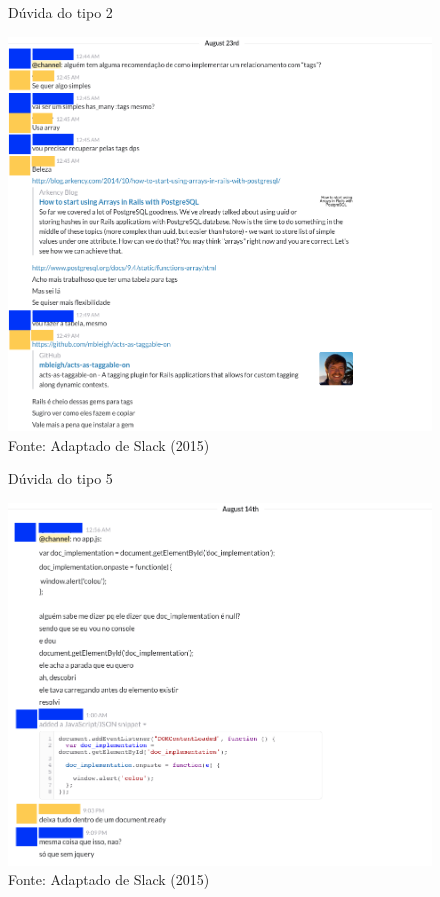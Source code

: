 \begin{figure}[h!]
	\centering
    \caption{Dúvida do tipo 2}
    \includegraphics[width=15cm]{Imagens/c-type-2-4-1-a.png}
	\caption*{Fonte: Adaptado de Slack (2015)}
\end{figure}

\begin{figure}[h!]
	\centering
    \caption{Dúvida do tipo 5}
    \includegraphics[width=15cm]{Imagens/c-type-5-1-1-a.png}
	\caption*{Fonte: Adaptado de Slack (2015)}
\end{figure}
